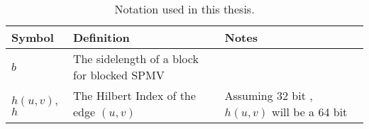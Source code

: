 \setlength{\arrayrulewidth}{0.5mm}
\setlength{\tabcolsep}{18pt}
\renewcommand{\arraystretch}{1.5}


\begin{table}
    \centering
    \begin{adjustwidth}{-0.75in}{-0.75in}

        \begin{tabular}{ |p{2cm}|p{6cm}|p{5cm}|  }
            \hline
            \textbf{Symbol}  & \textbf{Definition}                                                                                                 & \textbf{Notes}                \\
            \hline
            $b$ & The sidelength of a block for blocked \ac{SPMV} &           \\
            \hline
            $h(u, v)$, $h$ & The Hilbert Index of the edge $(u,v)$ & Assuming 32 bit \uint{}, $h(u, v)$ will be a 64 bit \uint{}         \\
            \hline

            
        \end{tabular}
        \caption{\label{tab:notation2}Notation used in this thesis.}
    \end{adjustwidth}
\end{table}


